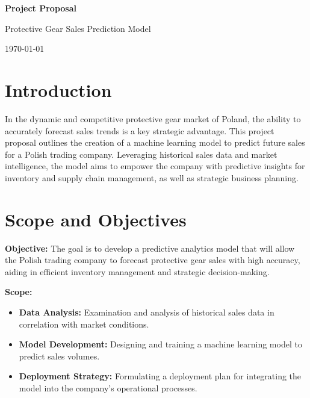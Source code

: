 \documentclass{article}
\begin{document}
\begin{titlepage}
    \centering
    \vspace*{4cm}
    {\Huge\bfseries Project Proposal \par}
    \vspace{2cm}
    {\huge Protective Gear Sales Prediction Model\par}
    \vfill
    \vspace{2cm}
    {\large \today\par}
\end{titlepage}

\newpage
\tableofcontents
\newpage    

\section{Introduction}

In the dynamic and competitive protective gear market of Poland, the ability to accurately forecast sales trends is a key strategic advantage. This project proposal outlines the creation of a machine learning model to predict future sales for a Polish trading company. Leveraging historical sales data and market intelligence, the model aims to empower the company with predictive insights for inventory and supply chain management, as well as strategic business planning.

\section{Scope and Objectives}

\textbf{Objective:} The goal is to develop a predictive analytics model that will allow the Polish trading company to forecast protective gear sales with high accuracy, aiding in efficient inventory management and strategic decision-making.

\textbf{Scope:}

\begin{itemize}
  \item \textbf{Data Analysis:} Examination and analysis of historical sales data in correlation with market conditions.
  \item \textbf{Model Development:} Designing and training a machine learning model to predict sales volumes.
  \item \textbf{Deployment Strategy:} Formulating a deployment plan for integrating the model into the company’s operational processes.
\end{itemize}
\end{document}
